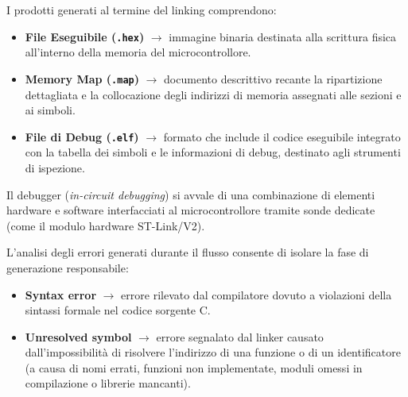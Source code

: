 I prodotti generati al termine del linking comprendono:
\begin{itemize}
    \item \textbf{File Eseguibile (\texttt{.hex})} $\rightarrow$ immagine binaria destinata alla scrittura fisica all'interno della memoria del microcontrollore.
    \item \textbf{Memory Map (\texttt{.map})} $\rightarrow$ documento descrittivo recante la ripartizione dettagliata e la collocazione degli indirizzi di memoria assegnati alle sezioni e ai simboli.
    \item \textbf{File di Debug (\texttt{.elf})} $\rightarrow$ formato che include il codice eseguibile integrato con la tabella dei simboli e le informazioni di debug, destinato agli strumenti di ispezione.
\end{itemize}

Il debugger (\textit{in-circuit debugging}) si avvale di una combinazione di elementi hardware e software interfacciati al microcontrollore tramite sonde dedicate (come il modulo hardware ST-Link/V2).

L'analisi degli errori generati durante il flusso consente di isolare la fase di generazione responsabile:
\begin{itemize}
    \item \textbf{Syntax error} $\rightarrow$ errore rilevato dal compilatore dovuto a violazioni della sintassi formale nel codice sorgente C.
    \item \textbf{Unresolved symbol} $\rightarrow$ errore segnalato dal linker causato dall'impossibilità di risolvere l'indirizzo di una funzione o di un identificatore (a causa di nomi errati, funzioni non implementate, moduli omessi in compilazione o librerie mancanti).
\end{itemize}

